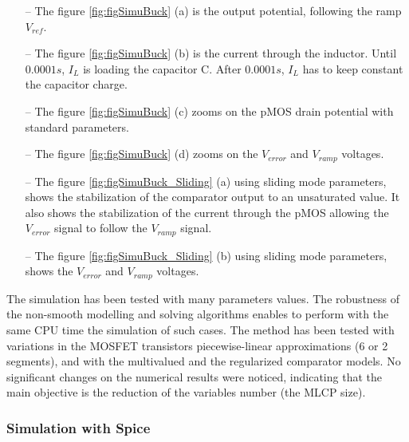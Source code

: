 \begin{enumerate}
  \item[--] The figure \ref{fig:figSimuBuck} (a) is the output potential, following the ramp $V_{ref}$.
    \item[--] The figure \ref{fig:figSimuBuck} (b) is the current through the inductor. Until $0.0001s$, $I_L$
    is loading the capacitor C. After $0.0001s$, $I_L$ has to keep constant the capacitor charge.
    \item[--] The figure \ref{fig:figSimuBuck} (c) zooms on the pMOS drain potential with standard
    parameters.
    \item[--] The figure  \ref{fig:figSimuBuck} (d) zooms on the $V_{error}$ and $V_{ramp}$ voltages.
    \item[--] The figure  \ref{fig:figSimuBuck_Sliding} (a) using sliding mode parameters, shows the stabilization of the comparator output to an unsaturated value. It also shows
      the stabilization of the current through the pMOS allowing the $V_{error}$ signal to follow the $V_{ramp}$
    signal.    
    \item[--] The figure \ref{fig:figSimuBuck_Sliding} (b) using sliding mode parameters, shows the $V_{error}$ and $V_{ramp}$ voltages.
  \end{enumerate}




The simulation has been tested with many parameters values. The robustness of the non-smooth modelling and solving algorithms enables to perform with the same CPU time the simulation of such cases. The method has been tested with variations in the MOSFET transistors piecewise-linear approximations (6 or 2 segments), and with the multivalued and the regularized comparator models. No significant changes on the numerical results were noticed, indicating that the main objective is the reduction of the variables number (the MLCP size).  



\subsubsection{Simulation with {\sc Spice} }

